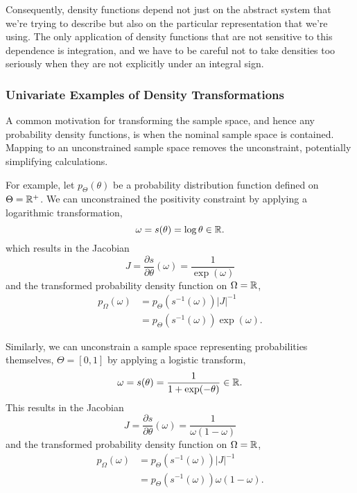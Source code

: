 Consequently, density functions depend not just on the abstract
system that we're trying to describe but also on the particular 
representation that we're using.  The only application of density
functions that are not sensitive to this dependence is integration,
and we have to be careful not to take densities too seriously when
they are not explicitly under an integral sign.

\subsubsection{Univariate Examples of Density Transformations}

A common motivation for transforming the sample space, and
hence any probability density functions, is when the nominal sample
space is contained.  Mapping to an unconstrained sample space
removes the unconstraint, potentially simplifying calculations.

For example, let $p_{\Theta} \! \left( \theta \right)$ be a probability 
distribution function defined on $\Theta = \mathbb{R}^{+}$.  We can 
unconstrained the positivity constraint by applying a logarithmic 
transformation,
%
\begin{equation*}
\omega = s \! \left( \theta \right) = \log \theta \in \mathbb{R}.
\end{equation*}
%
which results in the Jacobian
%
\begin{equation*}
J 
= \frac{ \partial s }{ \partial \theta} \! \left( \omega \right) 
= \frac{1}{\exp \! \left( \omega \right)}
\end{equation*}
%
and the transformed probability density function on $\Omega = \mathbb{R}$,
%
\begin{align*}
p_{\Omega} \! \left( \omega \right)
&=
p_{\Theta} \! \left( s^{-1} \! \left( \omega \right) \right) \left|J\right|^{-1}
\\
&=
p_{\Theta} \! \left( s^{-1} \! \left( \omega \right) \right)
\exp \! \left( \omega \right).
\end{align*}

Similarly, we can unconstrain a sample space representing probabilities
themselves, $\Theta = \left[0, 1 \right]$ by applying a logistic transform,
%
\begin{equation*}
\omega = s \! \left( \theta \right) = \frac{1}{1 + \exp( - \theta ) } \in \mathbb{R}.
\end{equation*}
%
This results in the Jacobian
%
\begin{equation*}
J 
= \frac{ \partial s }{ \partial \theta} \! \left( \omega \right) 
= \frac{1}{\omega \! \left( 1 - \omega \right) }
\end{equation*}
%
and the transformed probability density function on $\Omega = \mathbb{R}$,
%
\begin{align*}
p_{\Omega} \! \left( \omega \right)
&=
p_{\Theta} \! \left( s^{-1} \! \left( \omega \right) \right) \left|J\right|^{-1}
\\
&=
p_{\Theta} \! \left( s^{-1} \! \left( \omega \right) \right)
\omega \! \left( 1 - \omega \right).
\end{align*}

